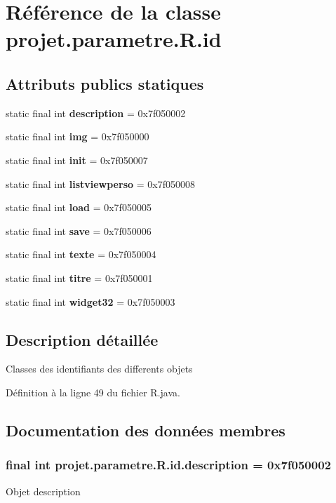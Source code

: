 \section{\-Référence de la classe projet.\-parametre.\-R.\-id}
\label{classprojet_1_1parametre_1_1_r_1_1id}
\subsection*{\-Attributs publics statiques}
\begin{DoxyCompactItemize}
\item 
static final int {\bf description} = 0x7f050002
\item 
static final int {\bf img} = 0x7f050000
\item 
static final int {\bf init} = 0x7f050007
\item 
static final int {\bf listviewperso} = 0x7f050008
\item 
static final int {\bf load} = 0x7f050005
\item 
static final int {\bf save} = 0x7f050006
\item 
static final int {\bf texte} = 0x7f050004
\item 
static final int {\bf titre} = 0x7f050001
\item 
static final int {\bf widget32} = 0x7f050003
\end{DoxyCompactItemize}


\subsection{\-Description détaillée}
\-Classes des identifiants des differents objets 

\-Définition à la ligne 49 du fichier \-R.\-java.



\subsection{\-Documentation des données membres}
\subsubsection[{description}]{\setlength{\rightskip}{0pt plus 5cm}final int {\bf projet.\-parametre.\-R.\-id.\-description} = 0x7f050002\hspace{0.3cm}{\ttfamily  [static]}}\label{classprojet_1_1parametre_1_1_r_1_1id_a22003fbdd8c93ba9c5d08eda9db35a31}
\-Objet description 

